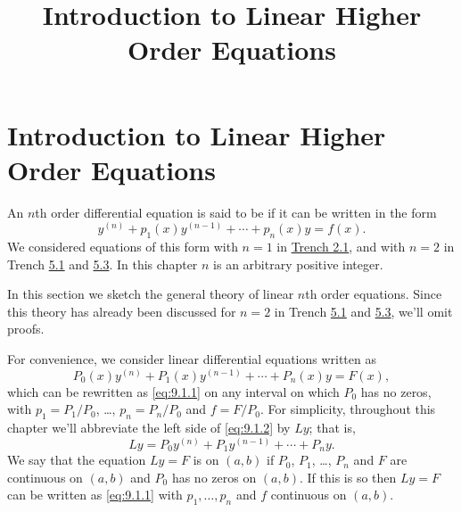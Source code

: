 \documentclass{ximera}
\title{Introduction to Linear Higher Order Equations}%
\begin{document}
\begin{abstract}

\end{abstract}

\maketitle

\section*{Introduction to Linear Higher Order Equations}

An $n$th order differential equation is said to be  if it
can be written in the form
\begin{equation}\label{eq:9.1.1}
y^{(n)}+p_1(x)y^{(n-1)}+\cdots+p_n(x)y=f(x).
\end{equation}
We considered equations of this form with $n=1$ in
\href{https://ximera.osu.edu/ode/main/linearFirstOrderDiffEq/linearFirstOrderDiffEq}{Trench 2.1}, and with $n=2$ in
Trench \href{https://ximera.osu.edu/ode/main/homogeneousLinearEquations/homogeneousLinearEquations}{5.1} and \href{https://ximera.osu.edu/ode/main/nonHomogeneousLinear/nonHomogeneousLinear}{5.3}. In this chapter $n$ is an arbitrary
positive integer.

In this section we sketch the general theory of linear $n$th order
equations. Since this theory has already been discussed for $n=2$ in Trench \href{https://ximera.osu.edu/ode/main/homogeneousLinearEquations/homogeneousLinearEquations}{5.1} and \href{https://ximera.osu.edu/ode/main/nonHomogeneousLinear/nonHomogeneousLinear}{5.3}, we'll omit
proofs.

For convenience, we consider linear differential equations written
as
\begin{equation}\label{eq:9.1.2}
P_0(x)y^{(n)}+P_1(x)y^{(n-1)}+\cdots+P_n(x)y=F(x),
\end{equation}
which can be rewritten as \eqref{eq:9.1.1} on any interval on
which $P_0$ has no zeros, with $p_1=P_1/P_0$, \dots, $p_n=P_n/P_0$ and
$f=F/P_0$. For simplicity, throughout this chapter we'll
abbreviate the left side of \eqref{eq:9.1.2} by $Ly$; that is,
$$
Ly=P_0y^{(n)}+P_1y^{(n-1)}+\cdots+P_ny.
$$
We say that the equation $Ly=F$ is  on $(a,b)$ if
$P_0$, $P_1$, \dots, $P_n$ and $F$ are continuous on $(a,b)$ and $P_0$ has
no zeros on $(a,b)$. If this is so then $Ly=F$ can be
written as \eqref{eq:9.1.1} with $p_1, \dots, p_n$ and $f$ continuous on
$(a,b)$.
\end{document}
